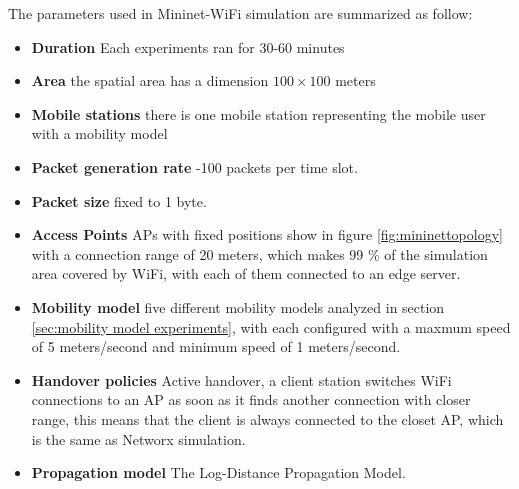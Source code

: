 The parameters used in Mininet-WiFi simulation are summarized as follow:
\begin{itemize}
	\item \textbf{Duration} \textemdash Each experiments ran for 30-60 minutes 
	\item \textbf{Area} \textemdash the spatial area has a dimension $100 \times 100$ meters
	\item \textbf{Mobile stations} \textemdash there is one mobile station representing the mobile user with a mobility model
	\item \textbf{Packet generation rate} -100 packets per time slot.
	\item \textbf{Packet size} \textemdash fixed to 1 byte.
	\item \textbf{Access Points}  APs with fixed positions show in figure \ref{fig:mininettopology} with a connection range of 20 meters, which makes 99 \% of the simulation area covered by WiFi, with each of them connected to an edge server.
	\item \textbf{Mobility model} \textemdash five different mobility models analyzed in section \ref{sec:mobility model experiments}, with each configured with a maxmum speed of 5 meters/second and minimum speed of 1 meters/second.
	\item \textbf{Handover policies} \textemdash Active handover, a client station switches WiFi connections to an AP as soon as it finds another connection with closer range, this means that the client is always connected to the closet AP, which is the same as Networx simulation.
	\item \textbf{Propagation model} \textemdash The Log-Distance Propagation Model.
\end{itemize}
%
%
%
%
%
%
%
%
%


